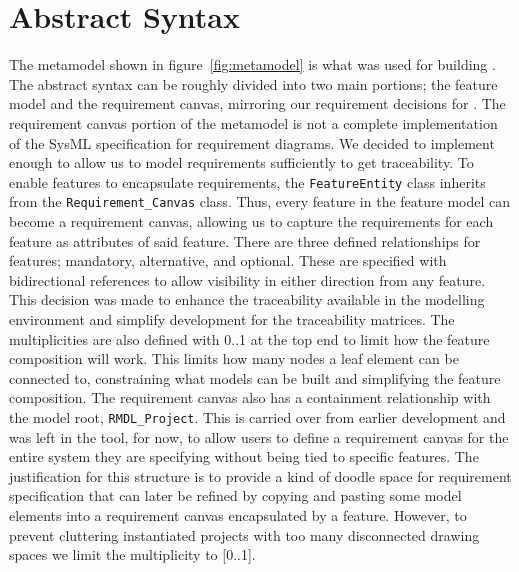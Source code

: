 \section{Abstract Syntax}
\label{sec:Abstract_Syntax}

The metamodel shown in figure~\ref{fig:metamodel} is what was used for building \tool. The abstract syntax can be roughly divided into two main portions; the feature model and the requirement canvas, mirroring our requirement decisions for \tool. The requirement canvas portion of the metamodel is not a complete implementation of the SysML specification for requirement diagrams. We decided to implement enough to allow us to model requirements sufficiently to get traceability. To enable features to encapsulate requirements, the \texttt{FeatureEntity} class inherits from the \texttt{Requirement\_Canvas} class. Thus, every feature in the feature model can become a requirement canvas, allowing us to capture the requirements for each feature as attributes of said feature. There are three defined relationships for features; mandatory, alternative, and optional. These are specified with bidirectional references to allow visibility in either direction from any feature. This decision was made to enhance the traceability available in the modelling environment and simplify development for the traceability matrices. The multiplicities are also defined with 0..1 at the top end to limit how the feature composition will work. This limits how many nodes a leaf element can be connected to, constraining what models can be built and simplifying the feature composition. The requirement canvas also has a containment relationship with the model root, \texttt{RMDL\_Project}. This is carried over from earlier development and was left in the tool, for now, to allow users to define a requirement canvas for the entire system they are specifying without being tied to specific features. The justification for this structure is to provide a kind of doodle space for requirement specification that can later be refined by copying and pasting some model elements into a requirement canvas encapsulated by a feature. However, to prevent cluttering instantiated projects with too many disconnected drawing spaces we limit the multiplicity to [0..1].

